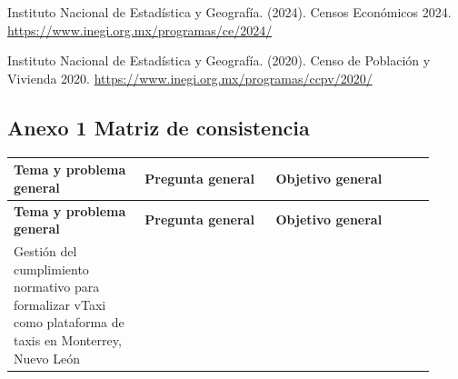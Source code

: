 {Instituto Nacional de Estadística y Geografía. (2024). Censos Económicos 2024. \url{https://www.inegi.org.mx/programas/ce/2024/}


Instituto Nacional de Estadística y Geografía. (2020). Censo de Población y Vivienda 2020. \url{https://www.inegi.org.mx/programas/ccpv/2020/}


\clearpage\pagestyle{empty}\begin{landscape}
\section*{Anexo 1 Matriz de consistencia}
\begingroup\small{}
\begin{longtable}{@{}p{0.29\linewidth}p{0.29\linewidth}p{0.34\linewidth}@{}}
\toprule
\textbf{Tema y problema general} & \textbf{Pregunta general} & \textbf{Objetivo general}\\
\midrule\endfirsthead
\toprule
\textbf{Tema y problema general} & \textbf{Pregunta general} & \textbf{Objetivo general}\\
\midrule\endhead
Gestión del cumplimiento normativo para formalizar vTaxi como plataforma de taxis en Monterrey, Nuevo León


\end{longtable}
\end{landscape}}
